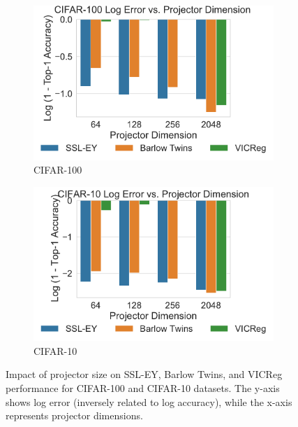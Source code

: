 \begin{figure}[H]
    \begin{subfigure}[b]{0.48\textwidth}
        \centering
        \includegraphics[width=\textwidth]{figures/SSL/cifar100_proj_dim_log_error}
        \caption{CIFAR-100}
        \label{fig:ssl_projector_dimensions_100}
    \end{subfigure}
    \hfill
    \begin{subfigure}[b]{0.48\textwidth}
        \centering
        \includegraphics[width=\textwidth]{figures/SSL/cifar10_proj_dim_log_error}
        \caption{CIFAR-10}
        \label{fig:ssl_projector_dimensions_10}
    \end{subfigure}
    \caption{Impact of projector size on SSL-EY, Barlow Twins, and VICReg performance for CIFAR-100 and CIFAR-10 datasets. The y-axis shows log error (inversely related to log accuracy), while the x-axis represents projector dimensions.}
    \label{fig:ssl_projector_dim}
\end{figure}

